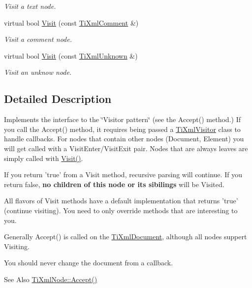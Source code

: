 \begin{DoxyCompactItemize}
\begin{DoxyCompactList}\small\item\em Visit a text node. \end{DoxyCompactList}\item 
virtual bool \hyperlink{class_ti_xml_visitor_a53a60e7a528627b31af3161972cc7fa2}{Visit} (const \hyperlink{class_ti_xml_comment}{Ti\-Xml\-Comment} \&)
\begin{DoxyCompactList}\small\item\em Visit a comment node. \end{DoxyCompactList}\item 
virtual bool \hyperlink{class_ti_xml_visitor_a7e284d607d275c51dac1adb58159ce28}{Visit} (const \hyperlink{class_ti_xml_unknown}{Ti\-Xml\-Unknown} \&)
\begin{DoxyCompactList}\small\item\em Visit an unknow node. \end{DoxyCompactList}\end{DoxyCompactItemize}


\subsection{Detailed Description}
Implements the interface to the \char`\"{}\-Visitor pattern\char`\"{} (see the Accept() method.) If you call the Accept() method, it requires being passed a \hyperlink{class_ti_xml_visitor}{Ti\-Xml\-Visitor} class to handle callbacks. For nodes that contain other nodes (Document, Element) you will get called with a Visit\-Enter/\-Visit\-Exit pair. Nodes that are always leaves are simply called with \hyperlink{class_ti_xml_visitor_afad71c71ce6473fb9b4b64cd92de4a19}{Visit()}.

If you return 'true' from a Visit method, recursive parsing will continue. If you return false, {\bfseries no children of this node or its sibilings} will be Visited.

All flavors of Visit methods have a default implementation that returns 'true' (continue visiting). You need to only override methods that are interesting to you.

Generally Accept() is called on the \hyperlink{class_ti_xml_document}{Ti\-Xml\-Document}, although all nodes suppert Visiting.

You should never change the document from a callback.

\begin{DoxySeeAlso}{See Also}
\hyperlink{class_ti_xml_node_acc0f88b7462c6cb73809d410a4f5bb86}{Ti\-Xml\-Node\-::\-Accept()} 
\end{DoxySeeAlso}


